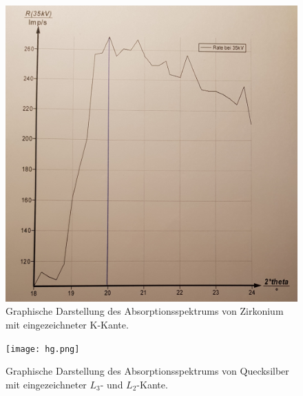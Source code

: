 \begin{figure}[H]
  \centering
  \includegraphics[width=\textwidth]{zirkonium.png}
  \caption{Graphische Darstellung des Absorptionsspektrums von Zirkonium mit eingezeichneter K-Kante.}
  \label{fig:plot}
\end{figure}

\begin{figure}[H]
  \centering
  \texttt{[image: hg.png]}
  \caption{Graphische Darstellung des Absorptionsspektrums von Quecksilber mit eingezeichneter $L_\text{3}$- und $L_\text{2}$-Kante.}
  \label{fig:plot}
\end{figure}